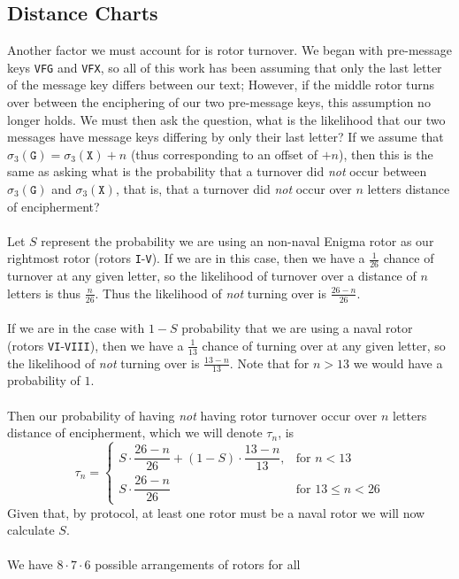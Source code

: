 \subsection{Distance Charts}\label{distance_chart}
Another factor we must account for is rotor turnover. We began with
pre-message keys \texttt{VFG} and \texttt{VFX}, so all of this work
has been assuming that only the last letter of the message key
differs between our text; However, if the middle rotor turns over
between the enciphering of our two pre-message keys, this
assumption no longer holds. We must then ask the question, what is
the likelihood that our two messages have message keys differing by
only their last letter? If we assume that $\sigma_3(\texttt{G}) =
\sigma_3(\texttt{X}) + n$ (thus corresponding to an offset of
$+n$), then this is the same as asking what is the probability that
a turnover did \emph{not} occur between $\sigma_3(\texttt{G})$ and
$\sigma_3(\texttt{X})$, that is, that a turnover did \emph{not}
occur over $n$ letters distance of encipherment?
\\\\Let $S$ represent the probability we are using an non-naval
Enigma rotor as our rightmost rotor (rotors \texttt{I}-\texttt{V}).
If we are in this case, then we have a $\frac{1}{26}$ chance of
turnover at any given letter, so the likelihood of turnover over a
distance of $n$ letters is thus $\frac{n}{26}$. Thus the likelihood
of \emph{not} turning over is $\frac{26-n}{26}$.
\\\\If we are in the case with $1-S$ probability that we are using
a naval rotor (rotors \texttt{VI}-\texttt{VIII}), then we have a
$\frac{1}{13}$ chance of turning over at any given letter, so the
likelihood of \emph{not} turning over is $\frac{13-n}{13}$. Note
that for $n>13$ we would have a probability of $1$.
\\\\Then our probability of having \emph{not} having rotor turnover
occur over $n$ letters distance of encipherment, which we will
denote $\tau_n$, is
\[
  \tau_n =
  \begin{cases}
    S \cdot \dfrac{26 - n}{26} + (1 - S) \cdot \dfrac{13 - n}{13},
    & \text{for } n < 13        \\
    S \cdot \dfrac{26 - n}{26}
    & \text{for } 13 \le n < 26
  \end{cases}
\]
Given that, by protocol, at least one rotor must be a naval rotor
we will now calculate $S$.
\\\\We have $8\cdot7\cdot6$ possible arrangements of rotors for all

